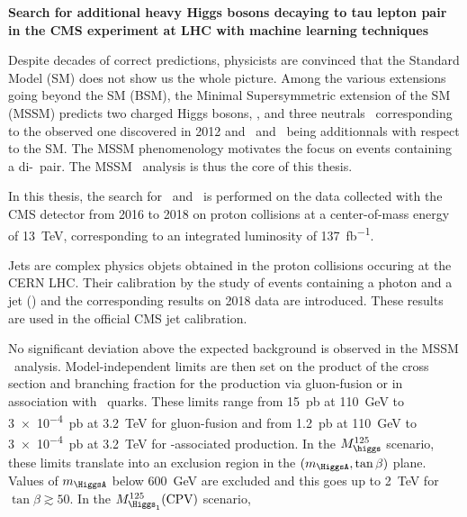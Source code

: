 \begin{center}
\LARGE
\bf
\sffamily
Search for additional heavy Higgs bosons decaying to tau lepton pair in the CMS experiment at LHC with machine learning techniques
\end{center}

\vspace{2\baselineskip}

Despite decades of correct predictions,
physicists are convinced that the Standard Model (SM) does not show us the whole picture.
Among the various extensions going beyond the SM (BSM),
the Minimal Supersymmetric extension of the SM (MSSM)
predicts
two charged Higgs bosons, \Higgspm,
and three neutrals\nospace{:}
\higgs\ corresponding to the observed one discovered in 2012
and
\Higgs\ and \HiggsA\ being additionnals with respect to the SM.
The MSSM phenomenology motivates the focus on events containing a di-\tau\ pair.
The MSSM \HAtoTauTau\ analysis is thus the core of this thesis.
\par
In this thesis,
the search
for \Higgs\ and \HiggsA\ 
is performed
on the data collected
with the CMS detector from 2016 to 2018
on proton collisions
at a center-of-mass energy of \SI{13}{\TeV},
corresponding to an integrated luminosity of \SI{137}{\femto\barn^{-1}}.
\par
Jets are complex physics objets
obtained
in the proton collisions occuring at the CERN LHC.
Their calibration by
the study of events containing a photon and a jet (\Gjet)
and the corresponding results on 2018 data
are introduced.
These results %
are used in the official CMS jet calibration.
\par
No significant deviation above the expected background is observed in the MSSM \HAtoTauTau\ analysis.
Model-independent limits are then set
on the product of the cross section and branching fraction
for the production
via gluon-fusion
or
in association with \quarkb~quarks.
These limits range
from
\SI{15}{\pico\barn} at \SI{110}{\GeV}
to
\SI{3e-4}{\pico\barn} at \SI{3.2}{\TeV}
for gluon-fusion
and from
\SI{1.2}{\pico\barn} at \SI{110}{\GeV}
to
\SI{3e-4}{\pico\barn} at \SI{3.2}{\TeV}
for \quarkb-associated production.
In the $M_{\higgs}^{125}$ scenario,
these limits translate into
an exclusion region in the $(m_{\HiggsA},\tan\beta)$ plane.
Values of $m_{\HiggsA}$ below \SI{600}{\GeV} are excluded
and this goes up to 
\SI{2}{\TeV} for $\tan\beta\gtrsim\num{50}$.
In the $M_{\Higgs_1}^{125}(\text{CPV})$ scenario,
